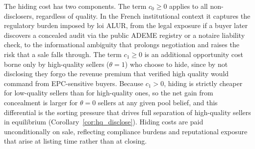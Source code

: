 The hiding cost has two components. The term $c_0\geq 0$ applies to all non-disclosers, regardless of quality. In the French institutional context it captures the regulatory burden imposed by loi ALUR, from the legal exposure if a buyer later discovers a concealed audit via the public ADEME registry or a notaire liability check, to the informational ambiguity that prolongs negotiation and raises the risk that a sale falls through. The term $c_1\geq 0$ is an additional opportunity cost borne only by high-quality sellers ($\theta=1$) who choose to hide, since by not disclosing they forgo the revenue premium that verified high quality would command from EPC-sensitive buyers. Because $c_1>0$, hiding is strictly cheaper for low-quality sellers than for high-quality ones, so the net gain from concealment is larger for $\theta=0$ sellers at any given pool belief, and this differential is the sorting pressure that drives full separation of high-quality sellers in equilibrium (Corollary~\ref{cor:hq_disclose}). Hiding costs are paid unconditionally on sale, reflecting compliance burdens and reputational exposure that arise at listing time rather than at closing.
